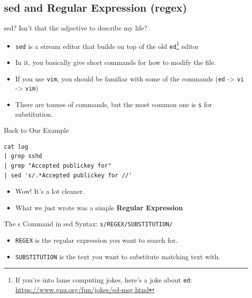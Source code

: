 \documentclass[12pt]{beamer}
\begin{document}
\subsection{sed and Regular Expression (regex)}
\begin{frame}{sed? Isn't that the adjective to describe my life?}
  \begin{itemize}
    \item \texttt{sed} is a stream editor that builds on top of the old \texttt{ed}\footnote{If you're into lame computing jokes, here's a joke about \texttt{ed}: \url{https://www.gnu.org/fun/jokes/ed-msg.html}} editor
    \item In it, you basically give short commands for how to modify the file.
    \item If you use \texttt{vim}, you should be familiar with some of the commands (\texttt{ed} -> \texttt{vi} -> \texttt{vim})
    \item There are tonnes of commands, but the most common one is \texttt{s} for substitution.
  \end{itemize}
\end{frame}

\begin{frame}[fragile]{Back to Our Example}
  \begin{verbatim}
cat log
| grep sshd
| grep "Accepted publickey for"
| sed 's/.*Accepted publickey for //'
  \end{verbatim}
  \begin{itemize}
    \item Wow! It's a lot cleaner.
    \item What we just wrote was a simple \textbf{Regular Expression}
  \end{itemize}
\end{frame}

\begin{frame}{The s Command in sed}
  Syntax: \texttt{s/REGEX/SUBSTITUTION/}
  \begin{itemize}
    \item \texttt{REGEX} is the regular expression you want to search for.
    \item \texttt{SUBSTITUTION} is the text you want to substitute matching text with.
  \end{itemize}
\end{frame}
\end{document}
